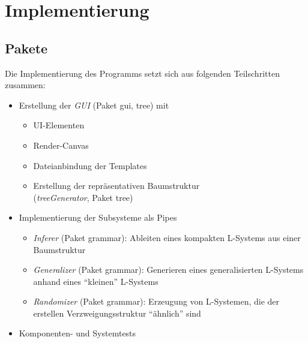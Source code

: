 
\chapter{Implementierung}

\section{Pakete}

Die Implementierung des Programms setzt sich aus folgenden Teilschritten zusammen:
\begin{itemize}
    \item Erstellung der \textit{GUI} (Paket gui, tree) mit
    \begin{itemize}
        \item UI-Elementen
        \item Render-Canvas
        \item Dateianbindung der Templates
        \item Erstellung der repräsentativen Baumstruktur\\ (\textit{treeGenerator}, Paket tree)
    \end{itemize}
    \item Implementierung der Subsysteme als Pipes
    \begin{itemize}
        \item \textit{Inferer} (Paket grammar): Ableiten eines kompakten L-Systems aus einer Baumstruktur
        \item \textit{Generalizer} (Paket grammar): Generieren eines generalisierten L-Systems anhand eines
        "`kleinen"' L-Systems
        \item \textit{Randomizer} (Paket grammar): Erzeugung von L-Systemen, die der erstellen
        Verzweigungsstruktur "`ähnlich"' sind
    \end{itemize}
    \item Komponenten- und Systemtests
\end{itemize}
